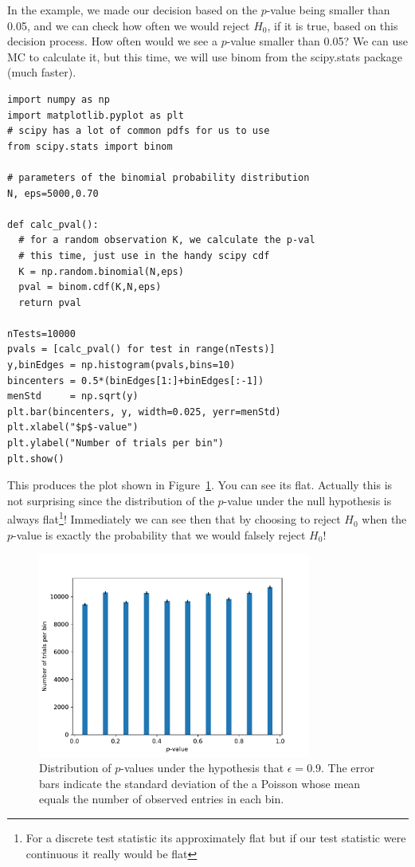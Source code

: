 In the example, we made our decision based on the $p$-value being smaller than 0.05, and we can check how often we would reject $H_0$, if it is true, based on this decision process. How often would we see a $p$-value smaller than 0.05? We can use MC to calculate it, but this time, we will use \textsf{binom} from the \textsf{scipy.stats} package (much faster). 
\clearpage
\begin{lstlisting}[style = Python]
import numpy as np
import matplotlib.pyplot as plt
# scipy has a lot of common pdfs for us to use
from scipy.stats import binom

# parameters of the binomial probability distribution
N, eps=5000,0.70

def calc_pval():
  # for a random observation K, we calculate the p-val
  # this time, just use in the handy scipy cdf
  K = np.random.binomial(N,eps)
  pval = binom.cdf(K,N,eps)
  return pval

nTests=10000
pvals = [calc_pval() for test in range(nTests)]
y,binEdges = np.histogram(pvals,bins=10)
bincenters = 0.5*(binEdges[1:]+binEdges[:-1])
menStd     = np.sqrt(y)
plt.bar(bincenters, y, width=0.025, yerr=menStd)
plt.xlabel("$p$-value")
plt.ylabel("Number of trials per bin")
plt.show()
\end{lstlisting}
This produces the plot shown in Figure~\ref{fig:p0dist}. You can see its flat. Actually this is not surprising since the distribution of the $p$-value under the null hypothesis is always flat\footnote{For a discrete test statistic its approximately flat but if our test statistic were continuous it really would be flat}! Immediately we can see then that by choosing to reject $H_0$ when the $p$-value is  exactly the probability that we would falsely reject $H_0$!

\begin{figure}
    \centering
    \includegraphics[width=0.8\textwidth]{figures/Hypotest/p0dist.pdf}
    \caption{Distribution of $p$-values under the hypothesis that $\epsilon=0.9$. The error bars indicate the standard deviation of the a Poisson whose mean equals the number of observed entries in each bin.}
    \label{fig:p0dist}
\end{figure}

